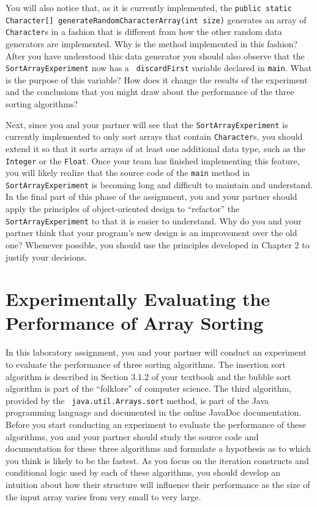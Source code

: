 You will also notice that, as it is currently implemented, the {\tt public static Character[]
generateRandomCharacterArray(int size)} generates an array of {\tt Character}s in a fashion that is different from how
the other random data generators are implemented. Why is the method implemented in this fashion? After you have
understood this data generator you should also observe that the {\tt SortArrayExperiment} now has a {\tt
discardFirst} variable declared in {\tt main}. What is the purpose of this variable? How does it change the results of
the experiment and the conclusions that you might draw about the performance of the three sorting algorithms?

Next, since you and your partner will see that the {\tt SortArrayExperiment} is currently implemented to only sort
arrays that contain {\tt Character}s, you should extend it so that it sorts arrays of at least one additional data type,
such as the {\tt Integer} or the {\tt Float}. Once your team has finished implementing this feature, you will likely
realize that the source code of the {\tt main} method in {\tt SortArrayExperiment} is becoming long and difficult to
maintain and understand. In the final part of this phase of the assignment, you and your partner should apply the
principles of object-oriented design to ``refactor'' the {\tt SortArrayExperiment} to that it is easier to
understand. Why do you and your partner think that your program's new design is an improvement over the old one?
Whenever possible, you should use the principles developed in Chapter 2 to justify your decisions.

\section*{Experimentally Evaluating the Performance of Array Sorting}

In this laboratory assignment, you and your partner will conduct an experiment to evaluate the performance of three
sorting algorithms. The insertion sort algorithm is described in Section 3.1.2 of your textbook and the bubble sort
algorithm is part of the ``folklore'' of computer science. The third algorithm, provided by the {\tt
java.util.Arrays.sort} method, is part of the Java programming language and documented in the online JavaDoc
documentation. Before you start conducting an experiment to evaluate the performance of these algorithms, you and your
partner should study the source code and documentation for these three algorithms and formulate a hypothesis as to which
you think is likely to be the fastest. As you focus on the iteration constructs and conditional logic used by each of
these algorithms, you should develop an intuition about how their structure will influence their performance as the size
of the input array varies from very small to very large.

